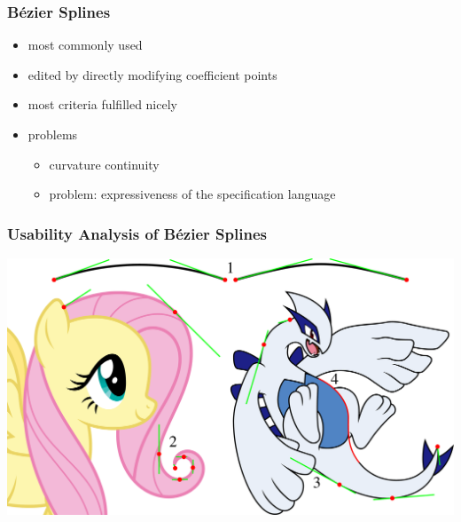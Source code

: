 \documentclass[mathserif]{beamer}
\begin{document}
		\begin{frame}
			\frametitle{Bézier Splines}
			\begin{itemize}
				\item most commonly used
				\item edited by directly modifying coefficient points
				\item most criteria fulfilled nicely
				\item problems
				\begin{itemize}
					\item curvature continuity
					\item problem: expressiveness of the specification language
				\end{itemize}
			\end{itemize}
		\end{frame}
		
		\begin{frame}
			\frametitle{Usability Analysis of Bézier Splines}
			\begin{centering}
				\includegraphics[width=\textwidth]{../resources/usability_bezier.pdf}
			\end{centering}
		\end{frame}
		
\end{document}
